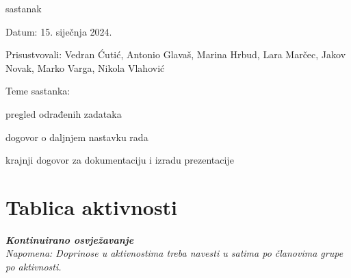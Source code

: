 \begin{packed_enum}
			\item  sastanak
			\item[] \begin{packed_item}
						\item Datum: 15. siječnja 2024.
						\item Prisustvovali: Vedran Ćutić, Antonio Glavaš, Marina Hrbud, Lara Marčec, Jakov Novak, Marko Varga, Nikola Vlahović
						\item Teme sastanka:
						\begin{packed_item}
							\item  pregled odrađenih zadataka
							\item  dogovor o daljnjem nastavku rada
							\item  krajnji dogovor za dokumentaciju i izradu prezentacije
						\end{packed_item}
			\end{packed_item}
			
			
		\end{packed_enum}
		
		\eject
		\section*{Tablica aktivnosti}
		
			\textbf{\textit{Kontinuirano osvježavanje}}\\
			
			 \textit{Napomena: Doprinose u aktivnostima treba navesti u satima po članovima grupe po aktivnosti.}

